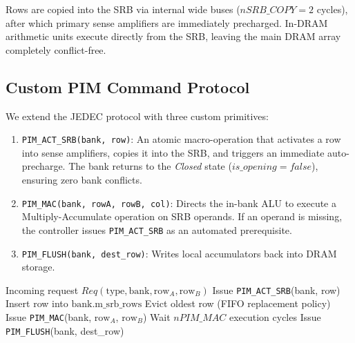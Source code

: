 \documentclass[10pt,twocolumn]{article}
\begin{document}
Rows are copied into the SRB via internal wide buses ($nSRB\_COPY = 2$ cycles), after which primary sense amplifiers are immediately precharged. In-DRAM arithmetic units execute directly from the SRB, leaving the main DRAM array completely conflict-free.

\subsection{Custom PIM Command Protocol}
We extend the JEDEC protocol with three custom primitives:
\begin{enumerate}
    \item \texttt{PIM\_ACT\_SRB(bank, row)}: An atomic macro-operation that activates a row into sense amplifiers, copies it into the SRB, and triggers an immediate auto-precharge. The bank returns to the \textit{Closed} state ($is\_opening = false$), ensuring zero bank conflicts.
    \item \texttt{PIM\_MAC(bank, rowA, rowB, col)}: Directs the in-bank ALU to execute a Multiply-Accumulate operation on SRB operands. If an operand is missing, the controller issues \texttt{PIM\_ACT\_SRB} as an automated prerequisite.
    \item \texttt{PIM\_FLUSH(bank, dest\_row)}: Writes local accumulators back into DRAM storage.
\end{enumerate}

\begin{algorithm}[t]
\caption{\small Decoupled SRB Controller Execution Logic}
\label{alg:srb}
\begin{algorithmic}[1]
\REQUIRE Incoming request $Req(\text{type}, \text{bank}, \text{row}_A, \text{row}_B)$
            \STATE Issue \texttt{PIM\_ACT\_SRB}(bank, row)
            \STATE Insert row into $\text{bank.m\_srb\_rows}$
                \STATE Evict oldest row (FIFO replacement policy)
            \ENDIF
        \ENDIF
    \ENDFOR
    \STATE Issue \texttt{PIM\_MAC}(bank, $\text{row}_A$, $\text{row}_B$)
    \STATE Wait $nPIM\_MAC$ execution cycles
    \STATE Issue \texttt{PIM\_FLUSH}(bank, dest\_row)
\ENDIF
\end{algorithmic}
\end{algorithm}
\end{document}
